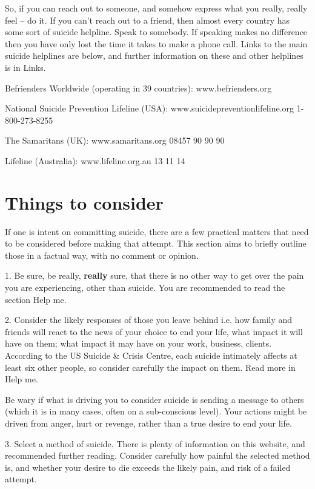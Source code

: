 \documentclass[12pt]{article}
\begin{document}
So, if you can reach out to someone, and somehow express what you really, really feel – do it. If you can’t reach out to a friend, then almost every country has some sort of suicide helpline. Speak to somebody. If speaking makes no difference then you have only lost the time it takes to make a phone call. Links to the main suicide helplines are below, and further information on these and other helplines is in Links.

Befrienders Worldwide (operating in 39 countries): www.befrienders.org

National Suicide Prevention Lifeline (USA): www.suicidepreventionlifeline.org 1-800-273-8255

The Samaritans (UK): www.samaritans.org 08457 90 90 90

Lifeline (Australia): www.lifeline.org.au 13 11 14

\section{Things to consider}

If one is intent on committing suicide, there are a few practical matters that need to be considered before making that attempt. This section aims to briefly outline those in a factual way, with no comment or opinion.

1. Be sure, be really, \textbf{really} sure, that there is no other way to get over the pain you are experiencing, other than suicide. You are recommended to read the section Help me.

2. Consider the likely responses of those you leave behind i.e. how family and friends will react to the news of your choice to end your life, what impact it will have on them; what impact it may have on your work, business, clients. According to the US Suicide \& Crisis Centre, each suicide intimately affects at least six other people, so consider carefully the impact on them. Read more in Help me.

Be wary if what is driving you to consider suicide is sending a message to others (which it is in many cases, often on a sub-conscious level). Your actions might be driven from anger, hurt or revenge, rather than a true desire to end your life.

3. Select a method of suicide. There is plenty of information on this website, and recommended further reading. Consider carefully how painful the selected method is, and whether your desire to die exceeds the likely pain, and risk of a failed attempt.
\end{document}
